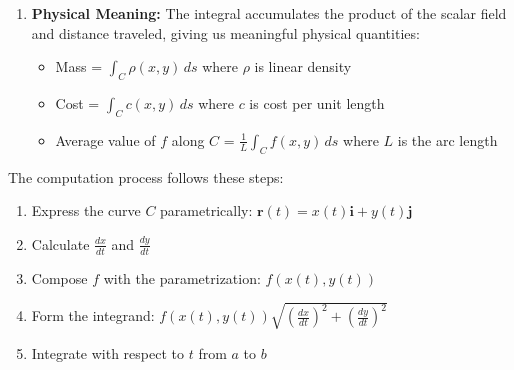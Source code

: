 \begin{enumerate}
\begin{figure}[H]
\caption{\textit{Geometric interpretation of a scalar line integral $\int_C f(x,y)\,ds$. The curve $C$ (shown in red) lies on the surface $z=f(x,y)$, while its projection onto the $xy$-plane is shown as a dashed magenta curve. The shaded ``curtain" between these curves represents the accumulation of the function values along the path, with each vertical height $f(x,y)$ being weighted by the infinitesimal arc length $ds$.}}
\label{fig:scalar_line_integral}
\end{figure}
    
    \item \textbf{Physical Meaning:} The integral accumulates the product of the scalar field and distance traveled, giving us meaningful physical quantities:
    \begin{itemize}
        \item Mass = $\int_C \rho(x,y)\,ds$ where $\rho$ is linear density
        \item Cost = $\int_C c(x,y)\,ds$ where $c$ is cost per unit length
        \item Average value of $f$ along $C$ = $\frac{1}{L}\int_C f(x,y)\,ds$ where $L$ is the arc length
    \end{itemize}
\end{enumerate}

\noindent The computation process follows these steps:
\begin{enumerate}
    \item Express the curve $C$ parametrically: $\mathbf{r}(t) = x(t)\mathbf{i} + y(t)\mathbf{j}$
    \item Calculate $\frac{dx}{dt}$ and $\frac{dy}{dt}$
    \item Compose $f$ with the parametrization: $f(x(t),y(t))$
    \item Form the integrand: $f(x(t),y(t))\sqrt{\left(\frac{dx}{dt}\right)^2 + \left(\frac{dy}{dt}\right)^2}$
    \item Integrate with respect to $t$ from $a$ to $b$
\end{enumerate}


